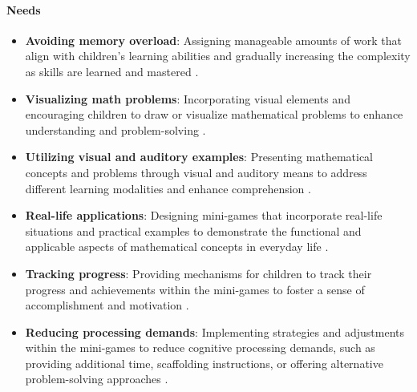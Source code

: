 \paragraph{Needs}
\begin{itemize}
    \item \textbf{Avoiding memory overload}: Assigning manageable amounts of work that align with children's learning abilities and gradually increasing the complexity as skills are learned and mastered \cite{pressbooks2024}.
    \item \textbf{Visualizing math problems}: Incorporating visual elements and encouraging children to draw or visualize mathematical problems to enhance understanding and problem-solving \cite{understood2024}.
    \item \textbf{Utilizing visual and auditory examples}: Presenting mathematical concepts and problems through visual and auditory means to address different learning modalities and enhance comprehension \cite{clevelandclinic2024}.
    \item \textbf{Real-life applications}: Designing mini-games that incorporate real-life situations and practical examples to demonstrate the functional and applicable aspects of mathematical concepts in everyday life \cite{pmc2024}.
    \item \textbf{Tracking progress}: Providing mechanisms for children to track their progress and achievements within the mini-games to foster a sense of accomplishment and motivation \cite{understood2024}.
    \item \textbf{Reducing processing demands}: Implementing strategies and adjustments within the mini-games to reduce cognitive processing demands, such as providing additional time, scaffolding instructions, or offering alternative problem-solving approaches \cite{understood2024}.
\end{itemize}

